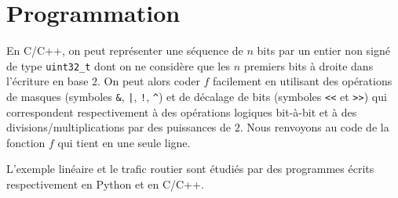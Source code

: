 \chapter{Programmation}

\begin{rem}
En C/C++, on peut repr\'esenter une s\'equence de $n$ bits par un entier non sign\'e de type \verb+uint32_t+ dont on ne consid\`ere que les $n$ premiers bits \`a droite dans l'\'ecriture en base $2$. On peut alors coder $f$ facilement en utilisant des op\'erations de \og masques \fg{} (symboles \verb+&+, \verb+|+, \verb+!+, \verb+^+) et de d\'ecalage de bits (symboles \verb+<<+ et \verb+>>+) qui correspondent respectivement \`a des op\'erations logiques bit-\`a-bit et \`a des divisions/multiplications par des puissances de $2$. Nous renvoyons au code de la fonction $f$ qui tient en une seule ligne.
\end{rem}

L'exemple lin\'eaire et le trafic routier sont \'etudi\'es par des programmes \'ecrits respectivement en Python et en C/C++.